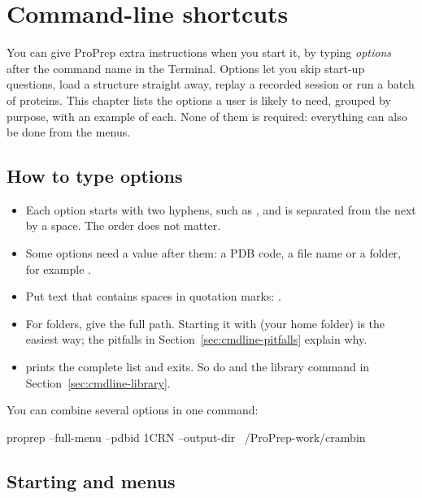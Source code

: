\chapter{Command-line shortcuts}\label{ch:cmdline}

You can give ProPrep extra instructions when you start it, by typing
\emph{options} after the command name in the Terminal. Options let you skip
start-up questions, load a structure straight away, replay a recorded session
or run a batch of proteins. This chapter lists the options a user is likely to
need, grouped by purpose, with an example of each. None of them is required:
everything can also be done from the menus.

\section{How to type options}\label{sec:cmdline-howto}

\begin{itemize}
  \item Each option starts with two hyphens, such as , and is
  separated from the next by a space. The order does not matter.
  \item Some options need a value after them: a PDB code, a file name or a
  folder, for example .
  \item Put text that contains spaces in quotation marks:
  .
  \item For folders, give the full path. Starting it with \typed{\textasciitilde{}/} (your home
  folder) is the easiest way; the pitfalls in Section~\ref{sec:cmdline-pitfalls}
  explain why.
  \item {} prints the complete list and exits. So do
   and the library command in
  Section~\ref{sec:cmdline-library}.
\end{itemize}

You can combine several options in one command:

\begin{terminal}
proprep --full-menu --pdbid 1CRN --output-dir ~/ProPrep-work/crambin
\end{terminal}

\section{Starting and menus}\label{sec:cmdline-start}

